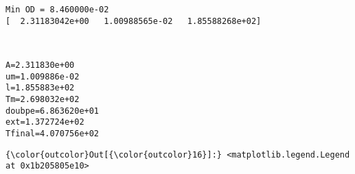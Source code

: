\documentclass[11pt]{article}
\begin{document}
    \begin{Verbatim}[commandchars=\\\{\}]
Min OD = 8.460000e-02
[  2.31183042e+00   1.00988565e-02   1.85588268e+02]

    \end{Verbatim}

    \begin{center}
    \end{center}
    { \hspace*{\fill} \\}
    
    \begin{Verbatim}[commandchars=\\\{\}]
A=2.311830e+00
um=1.009886e-02
l=1.855883e+02
Tm=2.698032e+02
doubpe=6.863620e+01
ext=1.372724e+02
Tfinal=4.070756e+02

    \end{Verbatim}

            \begin{Verbatim}[commandchars=\\\{\}]
{\color{outcolor}Out[{\color{outcolor}16}]:} <matplotlib.legend.Legend at 0x1b205805e10>
\end{Verbatim}
        
    \begin{center}
    \end{center}
    { \hspace*{\fill} \\}
    
    \begin{center}
    \end{center}
    { \hspace*{\fill} \\}
    
\end{document}
